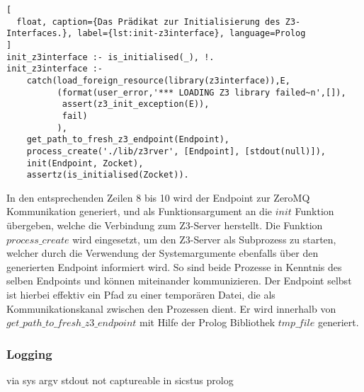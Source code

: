 \begin{lstlisting}[
  float, caption={Das Prädikat zur Initialisierung des Z3-Interfaces.}, label={lst:init-z3interface}, language=Prolog
]
init_z3interface :- is_initialised(_), !.
init_z3interface :-
    catch(load_foreign_resource(library(z3interface)),E,
          (format(user_error,'*** LOADING Z3 library failed~n',[]),
           assert(z3_init_exception(E)),
           fail)
          ),
    get_path_to_fresh_z3_endpoint(Endpoint),
    process_create('./lib/z3rver', [Endpoint], [stdout(null)]),
    init(Endpoint, Zocket),
    assertz(is_initialised(Zocket)).
\end{lstlisting}
In den entsprechenden Zeilen 8 bis 10 wird der Endpoint zur ZeroMQ Kommunikation generiert,
und als Funktionsargument an die $init$ Funktion übergeben, welche die Verbindung zum Z3-Server herstellt.
Die Funktion $process\_create$ wird eingesetzt, um den Z3-Server als Subprozess zu starten,
welcher durch die Verwendung der Systemargumente ebenfalls über den generierten Endpoint informiert wird.
So sind beide Prozesse in Kenntnis des selben Endpoints und können miteinander kommunizieren.
Der Endpoint selbst ist hierbei effektiv ein Pfad zu einer temporären Datei, die als Kommunikationskanal zwischen den Prozessen dient.
Er wird innerhalb von $get\_path\_to\_fresh\_z3\_endpoint$ mit Hilfe der Prolog Bibliothek $tmp\_file$ generiert.


\subsubsection{Logging}
\label{subsec:logging}

via sys argv
stdout not captureable in sicstus prolog



